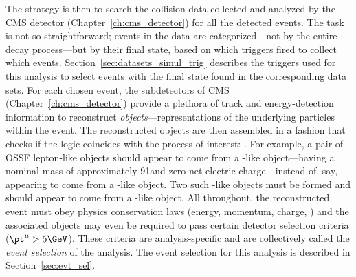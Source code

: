The strategy is then to search the \pp collision data collected and analyzed by the CMS detector (Chapter~\ref{ch:cms_detector}) for all the detected \hzzfourl events.
The task is not so straightforward;
events in the data are categorized---not by the entire decay process---but by their final state, based on which triggers fired to collect which events.
Section~\ref{sec:datasets_simul_trig} describes the triggers used for this analysis to select events with the \fourl final state found in the corresponding data sets.
For each chosen event, the subdetectors of CMS (Chapter~\ref{ch:cms_detector}) provide a plethora of track and energy-detection information to reconstruct \emph{objects}---representations of the underlying particles within the event.
The reconstructed objects are then assembled in a fashion that checks if the logic coincides with the process of interest: \hzzfourl.  %
For example, a pair of OSSF lepton-like objects should appear to come from a \PZ-like object---\ie having a nominal mass of approximately 91\GeV and zero net electric charge---instead of, say, appearing to come from a \PH-like object.
Two such \PZ-like objects must be formed and should appear to come from a \PH-like object.
All throughout, the reconstructed event must obey physics conservation laws (energy, momentum, charge, \etc) and the associated objects may even be required to pass certain detector selection criteria (\eg $\pt^\mu > 5\GeV$).
These criteria are analysis-specific and are collectively called the \emph{event selection} of the analysis.
The event selection for this analysis is described in Section~\ref{sec:evt_sel}.  %

